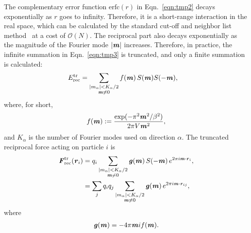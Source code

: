 \documentclass[aps,pre,preprint,unsortedaddress]{revtex4}
\renewcommand{\v}[1]{\textbf{\textit{#1}}}
\begin{document}
The complementary error function $\textrm{erfc}(r)$ in
Eqn.~\eqref{eqn:tmp2} decays exponentially as $r$ goes to infinity.
Therefore, it is a short-range interaction in the real space, which
can be calculated by the standard cut-off and neighbor list
method~\cite{frenkel02b} at a cost of $\mathcal O(N)$.  The reciprocal
part also decays exponentially as the magnitude of the Fourier mode
$\vert\v m\vert$ increases. Therefore, in practice, the infinite
summation in Eqn.~\eqref{eqn:tmp3} is truncated, and only a finite
summation is calculated:
\begin{align}\label{eqn:tmp6}
  E^{\textrm{tr}}_{\textrm{rec}} & =
  \sum_{
    \begin{subarray}{c}
      \vert m_\alpha\vert < K_\alpha/2\\
      \v m\neq 0
    \end{subarray}}
  f(\v m)\, S(\v m) S(-\v m),
\end{align}
where, for short,
\begin{align}
  f(\v m) := \frac{\exp(-\pi^2 \v m^2 / \beta^2)}{2\pi V \v m^2},
\end{align}
and $K_\alpha$ is the number of Fourier modes used on direction
$\alpha$.  The truncated reciprocal force acting on particle $i$ is
\begin{align}\nonumber
  \v F^{\textrm{tr}}_{\textrm{rec}}(\v r_i)
  &= 
  q_i 
  \sum_{
    \begin{subarray}{c}
      \vert m_\alpha\vert < K_\alpha/2\\
      \v m\neq 0
    \end{subarray}}
  \v g(\v m) \,
  S(-\v m)\,
  e^{2\pi i\v m\cdot\v r_i}, \\\label{eqn:tmp8}
  &= 
  \sum_j   q_iq_j
  \sum_{
    \begin{subarray}{c}
      \vert m_\alpha\vert < K_\alpha/2\\
      \v m\neq 0
    \end{subarray}}
  \v g(\v m) \,
  e^{2\pi i\v m\cdot\v r_{ij}},
\end{align}
where
\begin{align}
  \v g(\v m) = -4 \pi \v m i f(\v m).
\end{align}


\end{document}
